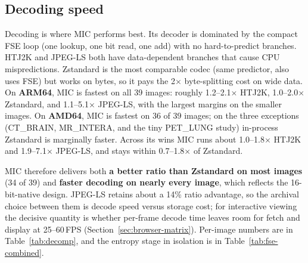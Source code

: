 \documentclass[journal]{IEEEtran}
\begin{document}
\subsection{Decoding speed}

Decoding is where MIC performs best. Its decoder is dominated by the compact
FSE loop (one lookup, one bit read, one add) with no hard-to-predict
branches. HTJ2K and JPEG-LS both have data-dependent branches that cause CPU
mispredictions. Zstandard is the most comparable codec (same predictor, also
uses FSE) but works on bytes, so it pays the 2$\times$ byte-splitting cost on
wide data. On \textbf{ARM64}, MIC is fastest on all 39 images: roughly
1.2--2.1$\times$ HTJ2K, 1.0--2.0$\times$ Zstandard, and 1.1--5.1$\times$
JPEG-LS, with the largest margins on the smaller images. On \textbf{AMD64},
MIC is fastest on 36 of 39 images; on the three exceptions (CT\_BRAIN,
MR\_INTERA, and the tiny PET\_LUNG study) in-process Zstandard is marginally
faster. Across its wins MIC runs about 1.0--1.8$\times$ HTJ2K and
1.9--7.1$\times$ JPEG-LS, and stays within 0.7--1.8$\times$ of Zstandard.

MIC therefore delivers both \textbf{a better ratio than Zstandard on most
images} (34 of 39) and \textbf{faster decoding on nearly every image}, which
reflects the 16-bit-native design. JPEG-LS retains about a 14\% ratio
advantage, so the archival choice between them is decode speed versus
storage cost; for interactive viewing the decisive quantity is whether
per-frame decode time leaves room for fetch and display at 25--60\,FPS
(Section~\ref{sec:browser-matrix}). Per-image numbers are in
Table~\ref{tab:decomp}, and the entropy stage in isolation is in
Table~\ref{tab:fse-combined}.
\end{document}
